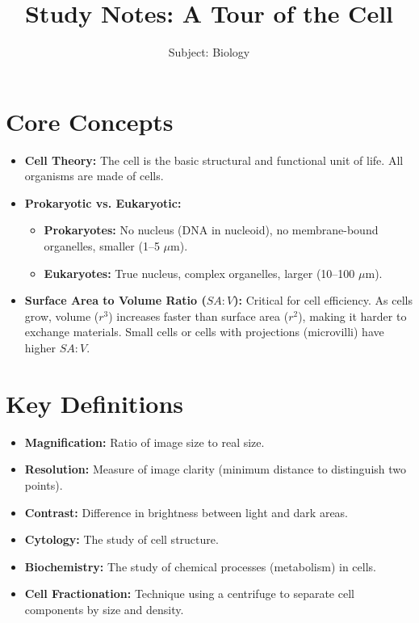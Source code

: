 \documentclass[11pt, a4paper]{article}
\title{Study Notes: A Tour of the Cell}
\author{Subject: Biology}
\date{}
\begin{document}
\maketitle

\section*{Core Concepts}
\begin{itemize}
    \item \textbf{Cell Theory:} The cell is the basic structural and functional unit of life. All organisms are made of cells.
    \item \textbf{Prokaryotic vs. Eukaryotic:}
    \begin{itemize}
        \item \textbf{Prokaryotes:} No nucleus (DNA in nucleoid), no membrane-bound organelles, smaller (1--5 $\mu$m).
        \item \textbf{Eukaryotes:} True nucleus, complex organelles, larger (10--100 $\mu$m).
    \end{itemize}
    \item \textbf{Surface Area to Volume Ratio ($SA:V$):} Critical for cell efficiency. As cells grow, volume ($r^3$) increases faster than surface area ($r^2$), making it harder to exchange materials. Small cells or cells with projections (microvilli) have higher $SA:V$.
\end{itemize}

\section*{Key Definitions}
\begin{itemize}
    \item \textbf{Magnification:} Ratio of image size to real size.
    \item \textbf{Resolution:} Measure of image clarity (minimum distance to distinguish two points).
    \item \textbf{Contrast:} Difference in brightness between light and dark areas.
    \item \textbf{Cytology:} The study of cell structure.
    \item \textbf{Biochemistry:} The study of chemical processes (metabolism) in cells.
    \item \textbf{Cell Fractionation:} Technique using a centrifuge to separate cell components by size and density.
\end{itemize}
\end{document}
